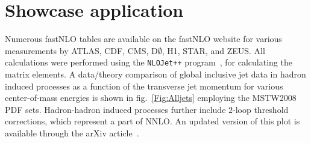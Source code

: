 \documentclass{DISproc}
\begin{document}
%




\section{Showcase application}

Numerous fastNLO tables are available on the fastNLO website
\cite{Fnlo:2012:Online} for various measurements by ATLAS, CDF, CMS,
D$\emptyset$, H1, STAR, and ZEUS.  All calculations were performed
using the \texttt{NLOJet++} program~\cite{Nagy:2001xb,Nagy:2001fj,Nagy:2003tz},
for calculating the matrix elements.  A data/theory comparison of global
inclusive jet data in hadron induced processes as a function of the
transverse jet momentum for various center-of-mass energies is shown
in fig.~\ref{Fig:Alljets} employing the MSTW2008 PDF
sets. Hadron-hadron induced processes further include $2$-loop
threshold corrections, which represent a part of NNLO. An
updated version of this plot is available through the arXiv
article~\cite{Wobisch:2011ij}.
\end{document}
